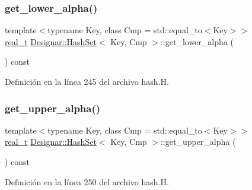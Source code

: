 \subsubsection{\texorpdfstring{get\+\_\+lower\+\_\+alpha()}{get\_lower\_alpha()}}
{\footnotesize\ttfamily template$<$typename Key, class Cmp = std\+::equal\+\_\+to$<$\+Key$>$$>$ \\
\hyperlink{namespace_designar_aca2c32af26808dbec1f3a3071fad25ce}{real\+\_\+t} \hyperlink{class_designar_1_1_hash_set}{Designar\+::\+Hash\+Set}$<$ Key, Cmp $>$\+::get\+\_\+lower\+\_\+alpha (\begin{DoxyParamCaption}{ }\end{DoxyParamCaption}) const\hspace{0.3cm}{\ttfamily [inline]}}



Definición en la línea 245 del archivo hash.\+H.

\mbox{\label{class_designar_1_1_hash_set_a6719373d3cf21f31d53de969bd81799f}} 
\subsubsection{\texorpdfstring{get\+\_\+upper\+\_\+alpha()}{get\_upper\_alpha()}}
{\footnotesize\ttfamily template$<$typename Key, class Cmp = std\+::equal\+\_\+to$<$\+Key$>$$>$ \\
\hyperlink{namespace_designar_aca2c32af26808dbec1f3a3071fad25ce}{real\+\_\+t} \hyperlink{class_designar_1_1_hash_set}{Designar\+::\+Hash\+Set}$<$ Key, Cmp $>$\+::get\+\_\+upper\+\_\+alpha (\begin{DoxyParamCaption}{ }\end{DoxyParamCaption}) const\hspace{0.3cm}{\ttfamily [inline]}}



Definición en la línea 250 del archivo hash.\+H.

\mbox{\label{class_designar_1_1_hash_set_af4014286f5665c9e1c149bd2f4225535}} 
